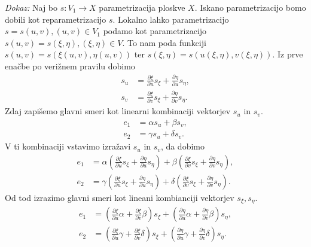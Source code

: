 \noindent
{\em Dokaz:\/}
Naj bo $s: V_1 \to  X$ parametrizacija ploskve $X$. Iskano parametrizacijo bomo dobili kot reparametrizacijo $s$.
Lokalno lahko parametrizacijo $s = s(u,v), (u,v) \in V_1$ podamo kot parametrizacijo $s(u,v) = s(\xi, \eta), (\xi, \eta) \in V$.
To nam poda funkciji $s(u,v) = s(\xi(u,v), \eta(u,v))$ ter $s(\xi, \eta) = s(u(\xi, \eta), v(\xi, \eta))$.  
Iz prve enačbe po verižnem pravilu dobimo \begin{align*}
    s_u &= \frac{ \partial \xi }{ \partial u } s_{\xi} + \frac{ \partial \eta }{ \partial u } s_{\eta},  \\
    s_v &= \frac{ \partial \xi }{ \partial v } s_{\xi} + \frac{ \partial \eta }{ \partial v } s_{\eta}.
\end{align*}
Zdaj zapišemo glavni smeri kot linearni kombinaciji vektorjev $s_u$ in $s_v$.
\begin{align*}
    e_1 &= \alpha s_u + \beta s_v, \\
    e_2 &= \gamma s_u + \delta s_v.
\end{align*}
V ti kombinaciji vstavimo izražavi $s_u$ in $s_v$, da dobimo \begin{align*}
  e_1 &= \alpha \left(\frac{ \partial \xi }{ \partial u } s_{\xi} + \frac{ \partial \eta }{ \partial u } s_{\eta}\right) + \beta \left(\frac{ \partial \xi }{ \partial v } s_{\xi} + \frac{ \partial \eta }{ \partial v } s_{\eta}\right), \\
  e_2 &= \gamma \left(\frac{ \partial \xi }{ \partial u } s_{\xi} + \frac{ \partial \eta }{ \partial u } s_{\eta}\right) + \delta \left(\frac{ \partial \xi }{ \partial v } s_{\xi} + \frac{ \partial \eta }{ \partial v } s_{\eta}\right).
\end{align*}
Od tod izrazimo glavni smeri kot lineani kombianciji vektorjev $s_{\xi}, s_{\eta}$. \begin{align*}
    e_{1} &= \left(\frac{ \partial \xi }{ \partial u } \alpha + \frac{ \partial \xi }{ \partial v } \beta \right) s_{\xi} + \left(\frac{ \partial \eta }{ \partial u } \alpha + \frac{ \partial \eta }{ \partial v } \beta \right) s_{\eta}, \\
    e_2 &= \left(\frac{ \partial \xi }{ \partial u } \gamma + \frac{ \partial \xi }{ \partial v } \delta \right) s_{\xi} + \left(\frac{ \partial \eta }{ \partial u } \gamma + \frac{ \partial \eta }{ \partial v } \delta \right) s_{\eta}.
\end{align*}

